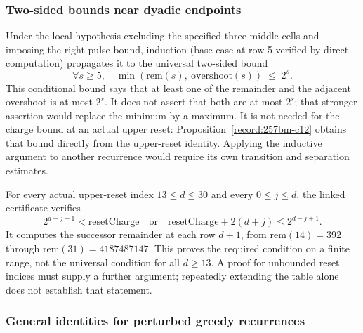 \subsubsection*{Two-sided bounds near dyadic endpoints}

\begin{thm}\label{record:257bm-i13}
Under the local hypothesis excluding the specified three middle cells and imposing the right-pulse
bound, induction (base case at row 5 verified by direct computation) propagates it to the universal
two-sided bound
\[
\forall s\ge5,\quad \min(\mathrm{rem}(s),\ \mathrm{overshoot}(s)) \;\le\; 2^s.
\]
This conditional bound says that at least one of the remainder and
the adjacent overshoot is at most $2^s$.  It does not assert that both
are at most $2^s$; that stronger assertion would replace the minimum
by a maximum.  It is not needed for the charge bound at an actual upper reset:
Proposition~\ref{record:257bm-c12} obtains that bound directly from the
upper-reset identity.  Applying the inductive argument to another
recurrence would require its own transition and separation estimates.
\end{thm}

\begin{prop}\label{record:257bm-i14}
For every actual upper-reset index $13\le d\le30$ and every
$0\le j\le d$, the linked certificate verifies
\[
2^{d-j+1}<\mathrm{resetCharge}
\quad\text{or}\quad
\mathrm{resetCharge}+2(d+j)\le2^{d-j+1}.
\]
It computes the successor remainder at each row $d+1$, from
$\mathrm{rem}(14)=392$ through $\mathrm{rem}(31)=4187487147$.
This proves the required condition on a finite
range, not the universal condition for all $d\ge13$. A proof for
unbounded reset indices must supply a further argument; repeatedly
extending the table alone does not establish that statement.
\end{prop}

\subsubsection*{General identities for perturbed greedy recurrences}

